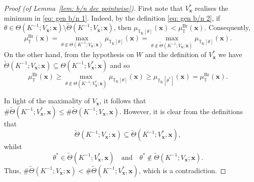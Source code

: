 \documentclass[10pt,a4paper]{amsart}
\newcommand{\T}{\mathbb{T}}
\newcommand{\bx}{\mathbf{x}}
\begin{document}
\begin{proof}[Proof (of Lemma~\ref{lem: b/n dec pointwise})]
First note that $V_{\bx}^*$ realises the minimum in \eqref{eq: gen b/n 1}. Indeed, by the definition \eqref{eq: gen b/n 2}, if $\theta \in \Theta(K^{-1}; V_{\bx}; \bx) \setminus  \widetilde{\Theta}(K^{-1}; V_{\bx}; \bx)$, then $\mu_{\T_{\mathrm{K}}[\theta]}(\bx) < \mu_{\T}^{\mathrm{Br}}(\bx)$. Consequently,
\begin{equation*}
    \mu_{\T}^{\mathrm{Br}}(\bx) =  \max_{\theta \notin \Theta(K^{-1}; V_{\bx}; \bx)} \mu_{\T_{\mathrm{K}}[\theta]}(\bx) = \max_{\theta \notin \widetilde{\Theta}(K^{-1}; V_{\bx}; \bx)} \mu_{\T_{\mathrm{K}}[\theta]}(\bx).
\end{equation*}
On the other hand, from the hypothesis on $W$ and the definition of $V_{\bx}^*$ we have $\widetilde{\Theta}(K^{-1}; V_{\bx}; \bx) \subseteq \Theta(K^{-1}; V_{\bx}^*; \bx)$ and so
\begin{equation*}
    \mu_{\T}^{\mathrm{Br}}(\bx) \geq \max_{\theta \notin \Theta(K^{-1}; V_{\bx}^*; \bx)} \mu_{\T_{\mathrm{K}}[\theta]}(\bx) \geq \mu_{\T_{\mathrm{K}}[\theta^*]}(\bx) = \mu_{\T}^{\mathrm{Br}}(\bx). 
\end{equation*}

In light of the maximality of $V_{\bx}$, it follows that $\# \widetilde{\Theta}(K^{-1}; V_{\bx}^*, \bx) \leq \# \widetilde{\Theta}(K^{-1}; V_{\bx},\bx)$. However, it is clear from the definitions that 
\begin{equation*}
    \widetilde{\Theta}(K^{-1}; V_{\bx}; \bx) \subseteq \widetilde{\Theta}(K^{-1}; V_{\bx}^*, \bx), 
\end{equation*}
whilst
\begin{equation*}
    \theta^* \in \widetilde{\Theta}(K^{-1}; V_{\bx}^*, \bx) \quad \textrm{and} \quad \theta^* \notin \widetilde{\Theta}(K^{-1}; V_{\bx}; \bx).
\end{equation*}
 Thus, $\# \widetilde{\Theta}(K^{-1}; V_{\bx}; \bx) < \# \widetilde{\Theta}(K^{-1}; V_{\bx}^*, \bx)$, which is a contradiction. 
\end{proof}
\end{document}
